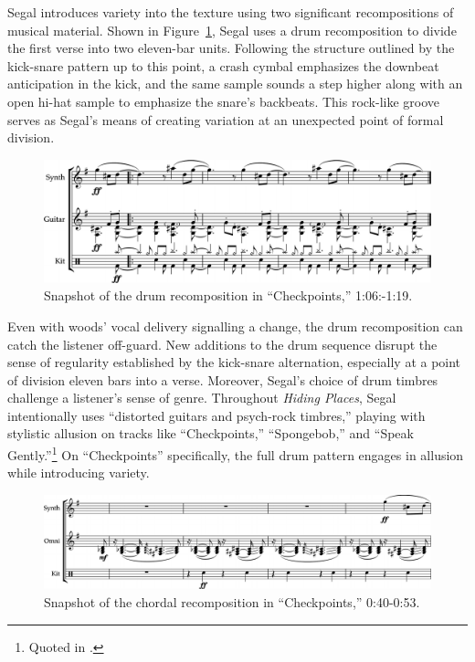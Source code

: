 Segal introduces variety into the texture using two significant recompositions of musical material. Shown in Figure~\ref{fig:checkpointsmain}, Segal uses a drum recomposition to divide the first verse into two eleven-bar units. Following the structure outlined by the kick-snare pattern up to this point, a crash cymbal emphasizes the downbeat anticipation in the kick, and the same sample sounds a step higher along with an open hi-hat sample to emphasize the snare's backbeats. This rock-like groove serves as Segal's means of creating variation at an unexpected point of formal division.

    \begin{figure}[ht]
        \centering
        \includegraphics[width=\textwidth]{images/figures/chp 02/106119checkpointsmain.pdf}
        \caption{Snapshot of the drum recomposition in ``Checkpoints,'' 1:06:-1:19.}
        \label{fig:checkpointsmain}
    \end{figure}

Even with woods' vocal delivery signalling a change, the drum recomposition can catch the listener off-guard. New additions to the drum sequence disrupt the sense of regularity established by the kick-snare alternation, especially at a point of division eleven bars into a verse. Moreover, Segal's choice of drum timbres challenge a listener's sense of genre. Throughout \emph{Hiding Places}, Segal intentionally uses ``distorted guitars and psych-rock timbres,'' playing with stylistic allusion on tracks like ``Checkpoints,'' ``Spongebob,'' and ``Speak Gently.''\footnote{Quoted in \cite{backwoodzhiphopKennySegalPresents2019}.} On ``Checkpoints'' specifically, the full drum pattern engages in allusion while introducing variety.

    \begin{figure}[ht]
        \centering
        \includegraphics[width=\textwidth]{images/figures/chp 02/040053checkpointsrecomp.pdf}
        \caption{Snapshot of the chordal recomposition in ``Checkpoints,'' 0:40-0:53.}
        \label{fig:checkpointsrecomp}
    \end{figure}

